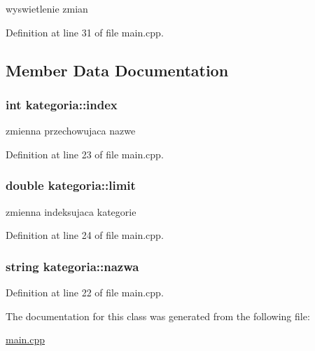 wyswietlenie zmian 

Definition at line 31 of file main.\+cpp.



\subsection{Member Data Documentation}
\hypertarget{classkategoria_a951b16b288aa128e2cd464368bedeb76}{}
\subsubsection[{index}]{\setlength{\rightskip}{0pt plus 5cm}int kategoria\+::index}\label{classkategoria_a951b16b288aa128e2cd464368bedeb76}


zmienna przechowujaca nazwe 



Definition at line 23 of file main.\+cpp.

\hypertarget{classkategoria_a7ff01cf2eefd1320444d2582e5bd0789}{}
\subsubsection[{limit}]{\setlength{\rightskip}{0pt plus 5cm}double kategoria\+::limit}\label{classkategoria_a7ff01cf2eefd1320444d2582e5bd0789}


zmienna indeksujaca kategorie 



Definition at line 24 of file main.\+cpp.

\hypertarget{classkategoria_a1017c975aefe921c7fc1273b90cd8329}{}
\subsubsection[{nazwa}]{\setlength{\rightskip}{0pt plus 5cm}string kategoria\+::nazwa}\label{classkategoria_a1017c975aefe921c7fc1273b90cd8329}


Definition at line 22 of file main.\+cpp.



The documentation for this class was generated from the following file\+:\begin{DoxyCompactItemize}
\item 
\hyperlink{main_8cpp}{main.\+cpp}\end{DoxyCompactItemize}
